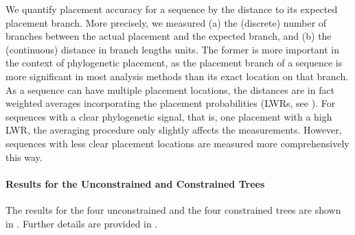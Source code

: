 We quantify placement accuracy for a sequence by the distance to its expected placement branch.
More precisely, we measured (a) the (discrete) number of branches between the actual placement and the expected branch,
and (b) the (continuous) distance in branch lengths units.
The former is more important in the context of phylogenetic placement,
as the placement branch of a sequence is more significant in most analysis methods than its exact location on that branch.
As a sequence can have multiple placement locations,
the distances are in fact weighted averages incorporating the placement probabilities
(LWRs, see ).
For sequences with a clear phylogenetic signal, that is, one placement with a high \ac{LWR},
the averaging procedure only slightly affects the measurements.
However, sequences with less clear placement locations are measured more comprehensively this way.


\paragraph{Results for the Unconstrained and Constrained Trees}
\label{ch:AutomaticTrees:sec:Evaluation:sub:Accuracy:par:UnconstrainedConstrainedResults}

The results for the four unconstrained and the four constrained trees are shown in .
Further details are provided in .


